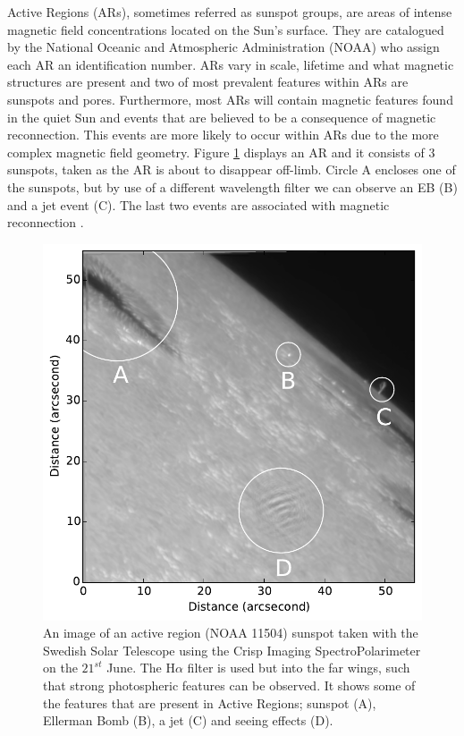     Active Regions (ARs), sometimes referred as sunspot groups, are areas of intense magnetic field concentrations located on the Sun's surface.
    They are catalogued by the National Oceanic and Atmospheric Administration (NOAA) who assign each AR an identification number.
    ARs vary in scale, lifetime and what magnetic structures are present and two of most prevalent features within ARs are sunspots and pores.
    Furthermore, most ARs will contain magnetic features found in the quiet Sun and events that are believed to be a consequence of magnetic reconnection.
    This events are more likely to occur within ARs due to the more complex magnetic field geometry.
    Figure \ref{fig:AR} displays an AR and it consists of 3 sunspots, taken as the AR is about to disappear off-limb.
    Circle A encloses one of the sunspots, but by use of a different wavelength filter we can observe an EB (B) and a jet event (C).
    The last two events are associated with magnetic reconnection \citep{2013SoPh..283..307N,2013A&A...560A..31N,2013ApJ...779..125N,2015ApJ...798...19N}.
     
    \begin{figure}
        \centering
        \includegraphics[width=\textwidth]{AR.pdf}
        \caption{
                 An image of an active region (NOAA 11504) sunspot taken with the Swedish Solar Telescope using the Crisp Imaging SpectroPolarimeter on the $21^{{st}}$ June. 
                 The H$\alpha$ filter is used but into the far wings, such that strong photospheric features can be observed.
                 It shows some of the features that are present in Active Regions; sunspot (A), Ellerman Bomb (B), a jet (C) and seeing effects (D).
                }
        \label{fig:AR}
     \end{figure}    

